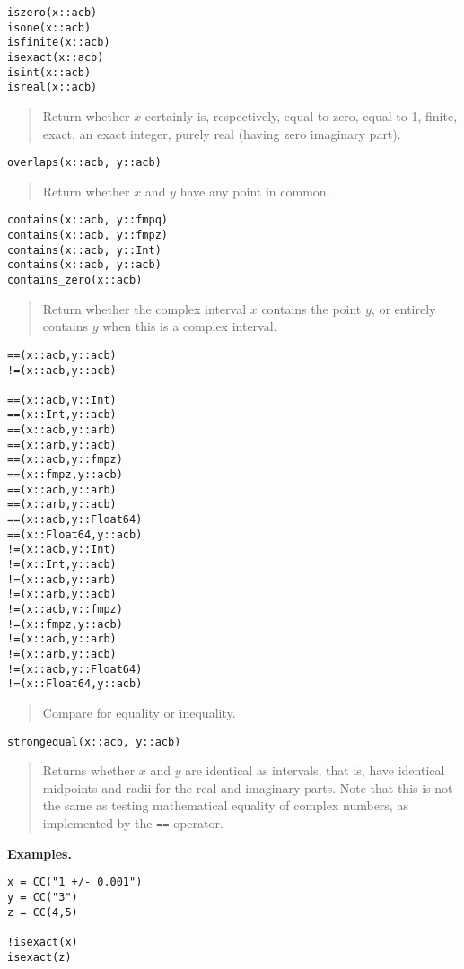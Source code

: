 \documentclass[a4paper,10pt]{article}
\newcommand{\code}{\lstinline}
\newcommand{\desc}[1]{\vspace{-3mm}\begin{quote}#1\end{quote}}
\begin{document}
{{\begin{lstlisting}
iszero(x::acb)
isone(x::acb)
isfinite(x::acb)
isexact(x::acb)
isint(x::acb)
isreal(x::acb)
\end{lstlisting}

\desc{Return whether $x$ certainly is, respectively, equal to zero,
equal to 1, finite, exact, an exact integer, purely real (having zero
imaginary part).}

\begin{lstlisting}
overlaps(x::acb, y::acb)
\end{lstlisting}

\desc{Return whether $x$ and $y$ have any point in common.}

\begin{lstlisting}
contains(x::acb, y::fmpq)
contains(x::acb, y::fmpz)
contains(x::acb, y::Int)
contains(x::acb, y::acb)
contains_zero(x::acb)
\end{lstlisting}

\desc{Return whether the complex interval $x$ contains the point $y$,
or entirely contains $y$ when this is a complex interval.}

\begin{lstlisting}
==(x::acb,y::acb)
!=(x::acb,y::acb)

==(x::acb,y::Int)
==(x::Int,y::acb)
==(x::acb,y::arb)
==(x::arb,y::acb)
==(x::acb,y::fmpz)
==(x::fmpz,y::acb)
==(x::acb,y::arb)
==(x::arb,y::acb)
==(x::acb,y::Float64)
==(x::Float64,y::acb)
!=(x::acb,y::Int)
!=(x::Int,y::acb)
!=(x::acb,y::arb)
!=(x::arb,y::acb)
!=(x::acb,y::fmpz)
!=(x::fmpz,y::acb)
!=(x::acb,y::arb)
!=(x::arb,y::acb)
!=(x::acb,y::Float64)
!=(x::Float64,y::acb)
\end{lstlisting}

\desc{Compare for equality or inequality.}

\begin{lstlisting}
strongequal(x::acb, y::acb)
\end{lstlisting}

\desc{Returns whether $x$ and $y$ are identical as intervals, that is,
have identical midpoints and radii for the real and imaginary parts.
Note that this is
not the same as testing mathematical equality of complex numbers,
as implemented by the \code{==} operator.}

\textbf{Examples.}

\begin{lstlisting}
x = CC("1 +/- 0.001")
y = CC("3")
z = CC(4,5)

!isexact(x)
isexact(z)


\end{lstlisting}}}
\end{document}
